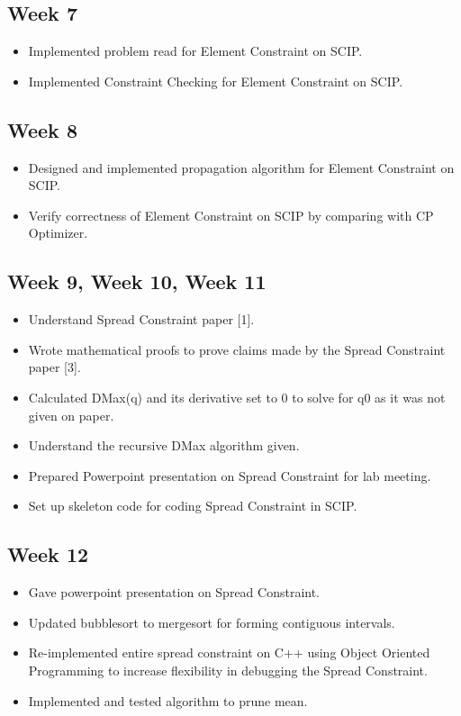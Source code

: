 \documentclass[a4paper,12pt]{article}
\begin{document}
\subsection{Week 7}
	\begin{itemize}
		\item Implemented problem read for Element Constraint on SCIP.
		\item Implemented Constraint Checking for Element Constraint on SCIP. 
	\end{itemize}
	
\subsection{Week 8}
	\begin{itemize}
		\item Designed and implemented propagation algorithm for Element Constraint on SCIP. 
		\item Verify correctness of Element Constraint on SCIP by comparing with CP Optimizer.  
	\end{itemize}
	
\subsection{Week 9, Week 10, Week 11}
	\begin{itemize}
		\item Understand Spread Constraint paper [1].
		\item Wrote mathematical proofs to prove claims made by the Spread Constraint paper [3]. 
		\item Calculated DMax(q) and its derivative set to 0 to solve for q0 as it was not given on paper. 
		\item Understand the recursive DMax algorithm given. 
		\item Prepared Powerpoint presentation on Spread Constraint for lab meeting. 
		\item Set up skeleton code for coding Spread Constraint in SCIP. 
	\end{itemize}

\subsection{Week 12}
	\begin{itemize}
		\item Gave powerpoint presentation on Spread Constraint. 
		\item Updated bubblesort to mergesort for forming contiguous intervals.  
		\item Re-implemented entire spread constraint on C++ using Object Oriented Programming to increase flexibility in debugging the Spread Constraint.  
		\item Implemented and tested algorithm to prune mean. 
	\end{itemize}
\end{document}
